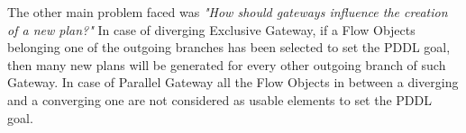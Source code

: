 The other main problem faced was \textit{"How should gateways influence the creation of a new plan?"}
In case of diverging Exclusive Gateway, if a Flow Objects belonging one of the outgoing branches has been selected to set the PDDL goal, then many new plans will be generated for every other outgoing branch of such Gateway.
In case of Parallel Gateway all the Flow Objects in between a diverging and a converging one are not considered as usable elements to set the PDDL goal. 

